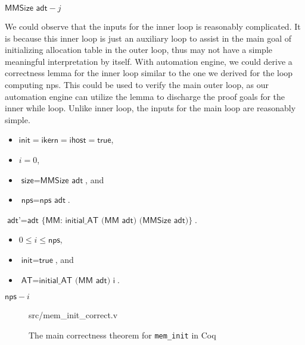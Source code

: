 \begin{definition}
$\textsf{MMSize adt}-j$
\end{definition}

We could observe that the inputs for the inner loop is reasonably complicated. It is because
this inner loop is just an auxiliary loop to assist in the main goal of initializing allocation table
in the outer loop, thus may not have a simple meaningful interpretation by itself.
With automation engine, we could derive a correctness lemma for the inner loop similar to the one
we derived for the loop computing \textsf{nps}. This could be used to verify the main outer loop,
as our automation engine can utilize the lemma to discharge the proof goals for the inner while loop.
Unlike inner loop, the inputs for the main loop are reasonably simple.

\begin{definition} 
\begin{itemize}
\item $\textsf{init} = \textsf{ikern} = \textsf{ihost} = \textsf{true}$,
\item $i=0$, 
\item $\textsf{size}=\textsf{MMSize adt}$, and
\item $\textsf{nps}=\textsf{nps adt}$.
\end{itemize}
\end{definition}

\begin{definition} 
$\textsf{adt'}=\textsf{adt \{MM: initial\_AT (MM adt) (MMSize adt)\}}$.
\end{definition}

\begin{definition}
\begin{itemize}
\item $0\le i \le \textsf{nps}$,
\item $\textsf{init}=\textsf{true}$, and
\item $\textsf{AT}=\textsf{initial\_AT (MM adt) i}$.
\end{itemize}
\end{definition}

\begin{definition}
$\textsf{nps}-i$
\end{definition}

\begin{figure}
	 {src/mem_init_correct.v}
	\caption{The main correctness theorem for \texttt{mem\_init} in Coq}
	\label{fig:mem_init_correct_v}
\end{figure}

